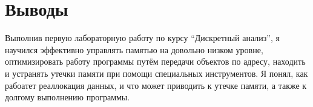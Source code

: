 \section{Выводы}

Выполнив первую лабораторную работу по курсу \enquote{Дискретный анализ}, я научился эффективно управлять памятью на довольно низком уровне, оптимизировать работу программы путём передачи объектов по адресу, находить и устранять утечки памяти при помощи специальных инструментов. Я понял, как рабоатет реаллокация данных, и что может приводить к утечке памяти, а также к долгому выполнению программы.
\pagebreak
